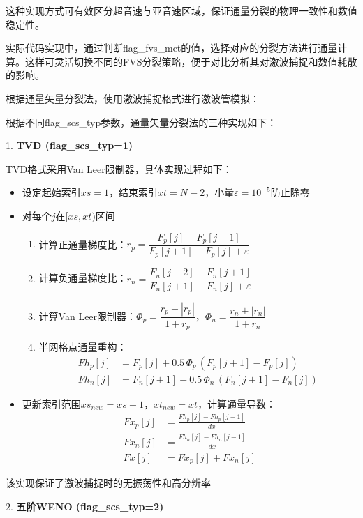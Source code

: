\documentclass[12pt,a4paper]{article}
\begin{document}
    这种实现方式可有效区分超音速与亚音速区域，保证通量分裂的物理一致性和数值稳定性。

实际代码实现中，通过判断flag\_fvs\_met的值，选择对应的分裂方法进行通量计算。这样可灵活切换不同的FVS分裂策略，便于对比分析其对激波捕捉和数值耗散的影响。

根据通量矢量分裂法，使用激波捕捉格式进行激波管模拟：

根据不同flag\_scs\_typ参数，通量矢量分裂法的三种实现如下：

1. \textbf{TVD (flag\_scs\_typ=1)}

TVD格式采用Van Leer限制器，具体实现过程如下：

\begin{itemize}
    \item 设定起始索引$xs=1$，结束索引$xt=N-2$，小量$\varepsilon=10^{-5}$防止除零
    \item 对每个$j$在$[xs, xt)$区间
    \begin{enumerate}
        \item 计算正通量梯度比：$r_p = \dfrac{F_p[j] - F_p[j-1]}{F_p[j+1] - F_p[j] + \varepsilon}$
        \item 计算负通量梯度比：$r_n = \dfrac{F_n[j+2] - F_n[j+1]}{F_n[j+1] - F_n[j] + \varepsilon}$
        \item 计算Van Leer限制器：$\Phi_p = \dfrac{r_p + |r_p|}{1 + r_p}$，$\Phi_n = \dfrac{r_n + |r_n|}{1 + r_n}$
        \item 半网格点通量重构：
        \begin{align*}
            Fh_p[j] &= F_p[j] + 0.5\,\Phi_p\,(F_p[j+1] - F_p[j]) \\
            Fh_n[j] &= F_n[j+1] - 0.5\,\Phi_n\,(F_n[j+1] - F_n[j])
        \end{align*}
    \end{enumerate}
    \item 更新索引范围$xs_{new}=xs+1$，$xt_{new}=xt$，计算通量导数：
    \begin{align*}
        Fx_p[j] &= \frac{Fh_p[j] - Fh_p[j-1]}{dx} \\
        Fx_n[j] &= \frac{Fh_n[j] - Fh_n[j-1]}{dx} \\
        Fx[j] &= Fx_p[j] + Fx_n[j]
    \end{align*}
\end{itemize}

该实现保证了激波捕捉时的无振荡性和高分辨率

2. \textbf{五阶WENO (flag\_scs\_typ=2)}
\end{document}
